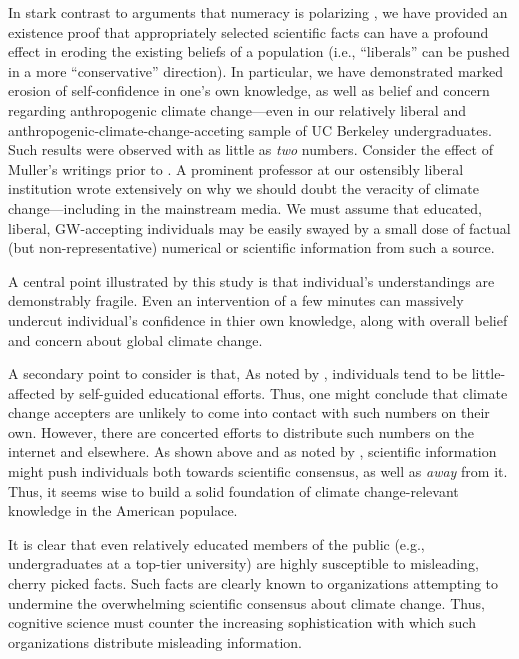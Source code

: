 In stark contrast to arguments that numeracy is polarizing
\parencite{kahan_polarizing_2012}, we have provided an existence proof that
appropriately selected scientific facts can have a profound effect in eroding
the existing beliefs of a population (i.e., “liberals” can be pushed in a more
“conservative” direction). In particular, we have demonstrated marked erosion of
self-confidence in one's own knowledge, as well as belief and concern regarding
anthropogenic climate change---even in our relatively liberal and
anthropogenic-climate-change-acceting sample of UC Berkeley undergraduates.
Such results were observed with as little as \emph{two} numbers.
Consider the effect of Muller's writings prior to \textcite{rohde_new_2013}. A
prominent professor at our ostensibly liberal institution wrote extensively on
why we should doubt the veracity of climate change---including in the mainstream
media. We must assume that educated, liberal, GW-accepting individuals may be
easily swayed by a small dose of factual (but non-representative) numerical or
scientific information from such a source.

A central point illustrated by this study is that individual's understandings
are demonstrably fragile. Even an intervention of a few minutes can massively
undercut individual's confidence in thier own knowledge, along with overall
belief and concern about global climate change.

A secondary point to consider is that, As noted by
\textcite{kahan_polarizing_2012,mccright_politicization_2011},
individuals tend to be little-affected by self-guided educational efforts. Thus,
one might conclude that climate change accepters are unlikely to come into
contact with such numbers on their own.  However, there are concerted efforts to
distribute such numbers on the internet and elsewhere. As shown above and as
noted by \textcite{mccright_politicization_2011}, scientific information might push individuals both
towards scientific consensus, as well as \emph{away} from it.  Thus, it seems
wise to build a solid foundation of climate change-relevant knowledge in the
American populace. 

It is clear that even relatively educated members of the public (e.g.,
undergraduates at a top-tier university) are highly susceptible to misleading,
cherry picked facts. Such facts are clearly known to organizations attempting to
undermine the overwhelming scientific consensus about climate change. Thus,
cognitive science must counter the increasing sophistication with which such
organizations distribute misleading information.

